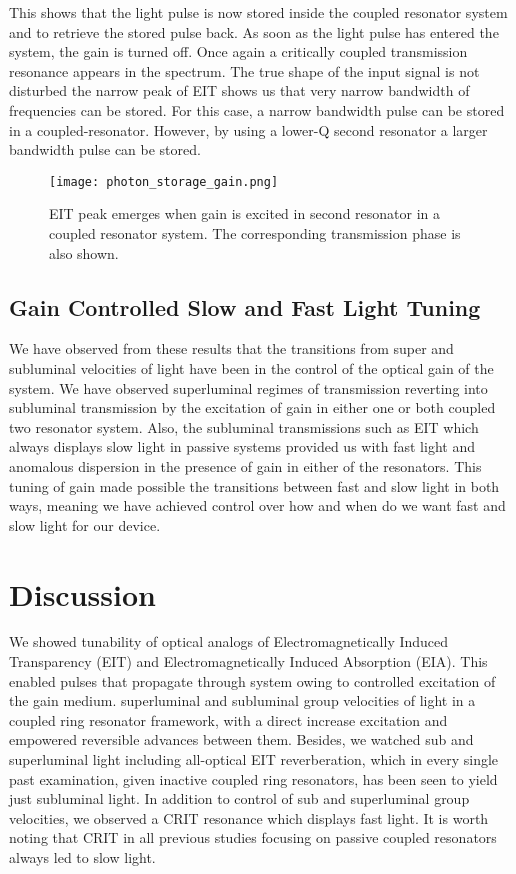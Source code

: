 This shows that the light pulse is now stored inside the coupled resonator system and to retrieve the stored pulse back. As soon as the light pulse has entered the system, the gain is turned off. Once again a critically coupled transmission resonance appears in the spectrum. The true shape of the input signal is not disturbed the narrow peak of EIT shows us that very narrow bandwidth of frequencies can be stored. For this case, a narrow bandwidth pulse can be stored in a coupled-resonator. However, by using a lower-Q second resonator a larger bandwidth pulse can be stored.

\begin{figure}[h]
\centering 
\texttt{[image: photon\_storage\_gain.png]}
\caption{EIT peak emerges when gain is excited in second resonator in a coupled resonator system. The corresponding transmission phase is also shown.}
\end{figure}

\subsection{Gain Controlled Slow and Fast Light Tuning}
We have observed from these results that the transitions from super and subluminal velocities of light have been in the control of the optical gain of the system. We have observed superluminal regimes of transmission reverting into subluminal transmission by the excitation of gain in either one or both coupled two resonator system. Also, the subluminal transmissions such as EIT which always displays slow light in passive systems provided us with fast light and anomalous dispersion in the presence of gain in either of the resonators. This tuning of gain made possible the transitions between fast and slow light in both ways, meaning we have achieved control over how and when do we want fast and slow light for our device.

\newpage
\section{Discussion}
We showed tunability of optical analogs of Electromagnetically Induced Transparency (EIT) and Electromagnetically Induced Absorption (EIA). This enabled pulses that propagate through system owing to controlled excitation of the gain medium. superluminal and subluminal group velocities of light in a coupled ring resonator framework, with a direct increase excitation and empowered reversible advances between them. Besides, we watched sub and superluminal light including all-optical EIT reverberation, which in every single past examination, given inactive coupled ring resonators, has been seen to yield just subluminal light. In addition to control of sub and superluminal group velocities, we observed a CRIT resonance which displays fast light. It is worth noting that CRIT in all previous studies focusing on passive coupled resonators always led to slow light. 


